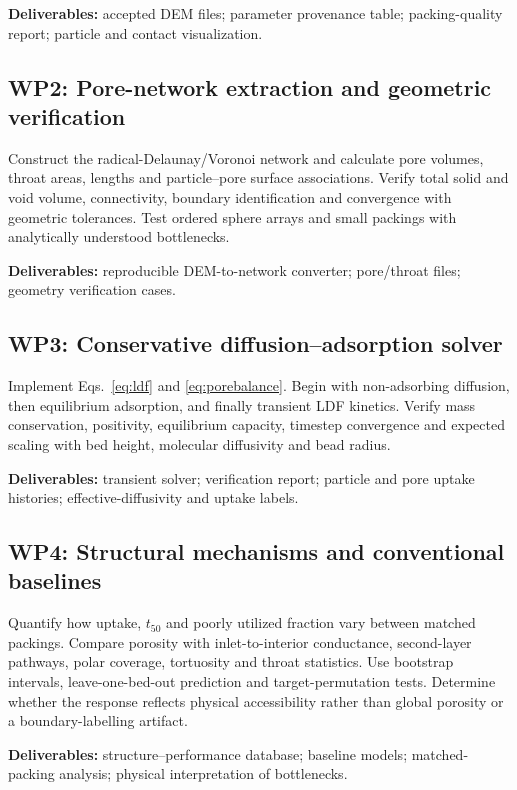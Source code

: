\documentclass[12pt,a4paper]{article}
\begin{document}
\textbf{Deliverables:} accepted DEM files; parameter provenance table;
packing-quality report; particle and contact visualization.

\subsection*{WP2: Pore-network extraction and geometric verification}

Construct the radical-Delaunay/Voronoi network and calculate pore volumes,
throat areas, lengths and particle--pore surface associations. Verify total
solid and void volume, connectivity, boundary identification and convergence
with geometric tolerances. Test ordered sphere arrays and small packings with
analytically understood bottlenecks.

\textbf{Deliverables:} reproducible DEM-to-network converter; pore/throat files;
geometry verification cases.

\subsection*{WP3: Conservative diffusion--adsorption solver}

Implement Eqs.~\eqref{eq:ldf} and \eqref{eq:porebalance}. Begin with
non-adsorbing diffusion, then equilibrium adsorption, and finally transient LDF
kinetics. Verify mass conservation, positivity, equilibrium capacity,
timestep convergence and expected scaling with bed height, molecular
diffusivity and bead radius.

\textbf{Deliverables:} transient solver; verification report; particle and pore
uptake histories; effective-diffusivity and uptake labels.

\subsection*{WP4: Structural mechanisms and conventional baselines}

Quantify how uptake, $t_{50}$ and poorly utilized fraction vary between matched
packings. Compare porosity with inlet-to-interior conductance, second-layer
pathways, polar coverage, tortuosity and throat statistics. Use bootstrap
intervals, leave-one-bed-out prediction and target-permutation tests. Determine
whether the response reflects physical accessibility rather than global
porosity or a boundary-labelling artifact.

\textbf{Deliverables:} structure--performance database; baseline models;
matched-packing analysis; physical interpretation of bottlenecks.
\end{document}
